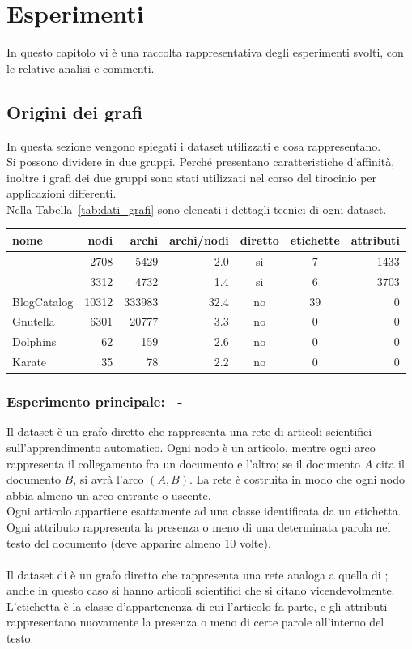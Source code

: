 %
%
\chapter{Esperimenti}\label{chap:3}
In questo capitolo vi è una raccolta rappresentativa degli esperimenti svolti, con le relative analisi e commenti.
\section{Origini dei grafi}
In questa sezione vengono spiegati i dataset utilizzati e cosa rappresentano.\\
Si possono dividere in due gruppi. Perché presentano caratteristiche d'affinità, inoltre i grafi dei due gruppi sono stati utilizzati nel corso del tirocinio per applicazioni differenti.\\
Nella Tabella~\ref{tab:dati_grafi} sono elencati i dettagli tecnici di ogni dataset.
%
\begin{center}
	\begin{tabular}{|l|r|r|r|c|c|r|}
		\hline
		nome&nodi&archi&archi/nodi&diretto&etichette&attributi\\
		\hline
		\cora & 2708 & 5429 & 2.0 & sì & 7 & 1433\\
		\citeseer & 3312 & 4732 & 1.4 & sì & 6 & 3703\\
		\hline
		BlogCatalog & 10312 & 333983 & 32.4 & no & 39 & 0\\
		Gnutella & 6301 & 20777 & 3.3 & no & 0 & 0\\
		Dolphins & 62 & 159 & 2.6 & no & 0 & 0\\
		Karate & 35 & 78 & 2.2 & no & 0 & 0\\
		\hline
		\end{tabular}
		\label{tab:dati_grafi}
\end{center}
%
\subsection*{Esperimento principale: \cora\ - \citeseer}\cite{Co-Ci_1}\cite{Co-Ci_2}
Il dataset \textbf{\cora} è un grafo diretto che rappresenta una rete di articoli scientifici sull'apprendimento automatico. Ogni nodo è un articolo, mentre ogni arco rappresenta il collegamento fra un documento e l'altro; se il documento $A$ cita il documento $B$, si avrà l'arco $(A, B)$. La rete è costruita in modo che ogni nodo abbia almeno un arco entrante o uscente.\\
Ogni articolo appartiene esattamente ad una classe identificata da un etichetta. Ogni attributo rappresenta la presenza o meno di una determinata parola nel testo del documento (deve apparire almeno 10 volte).\\
\\
Il dataset di \textbf{\citeseer} è un grafo diretto che rappresenta una rete analoga a quella di \cora; anche in questo caso si hanno articoli scientifici che si citano vicendevolmente. L'etichetta è la classe d'appartenenza di cui l'articolo fa parte, e gli attributi rappresentano nuovamente la presenza o meno di certe parole all'interno del testo.\\
%
